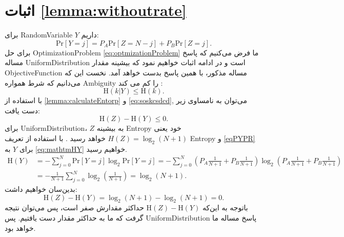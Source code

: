 \section{اثبات \autoref{lemma:withoutrate}}
\label{sec:withoutrate}
برای
\gls{RandomVariable} $Y$
داریم:
\begin{equation}
\mathrm{Pr}[Y=j] = P_A \mathrm{Pr}[Z=N-j]+P_B\mathrm{Pr}[Z=j].
\label{eqPYPR}
\end{equation}
برای حل
\gls{OptimizationProblem} \eqref{eq:optmizationProblem} 
ما فرض می‌کنیم که پاسخ مساله 
\gls{UniformDistribution}
است و در ادامه اثبات خواهیم نمود که بیشینه مقدار
\gls{ObjectiveFunction}
مساله مذکور، با همین پاسخ بدست خواهد آمد. نخست این که می‌دانیم که شرط همواره 
\gls{Ambiguity}
را کم می کند
\cite[صفحه 248]{marinescu2011classical}:
\begin{equation}
\mathrm{H}(k|Y) \leq \mathrm{H}(k).
\label{eq:soskcsdcd}
\end{equation}
با استفاده از 
 \autoref{lemma:calculateEntorp} و \eqref{eq:soskcsdcd}, 
 می‌توان به نامساوی زیر دست یافت:
\begin{equation}
\mathrm{H}(Z) - \mathrm{H}(Y) \leq 0.
\label{eq:maxvalreach}
\end{equation}
برای
\gls{UniformDistribution}، $Z$
به بیشینه
\gls{Entropy}
خود یعنی
$H(Z) = \log_2 (N+1)$
خواهد رسید
\cite[قضیه $1.4.2$]{ash2012information}.
با استفاده از تعریف
\gls{Entropy} و 
\eqref{eqPYPR}  برای  $Y$ 
به 
 \eqref{eq:mathtmHY}
خواهیم رسید. 
\begin{align}
\mathrm{H}(Y)  &= -\sum_{j=0}^{N}\mathrm{Pr}[Y=j] \log_2 \mathrm{Pr}[Y=j]= -\sum_{j=0}^{N} \left(P_A \frac{1}{N+1}+P_B\frac{1}{N+1}\right)\log_2 \left(P_A \frac{1}{N+1}+P_B\frac{1}{N+1}\right)\nonumber\\
&=-\frac{1}{N+1}\sum_{j=0}^{N}\log_2 \left(\frac{1}{N+1}\right)=\log_2 (N+1).
\label{eq:mathtmHY}
\end{align}
بدین‌سان خواهیم داشت:
\begin{equation*}
\mathrm{H}(Z) - \mathrm{H}(Y) = \log_2 (N+1) - \log_2 (N+1) =0.
\end{equation*}
باتوجه به این‌که 
$\mathrm{H}(Z) - \mathrm{H}(Y)$
حداکثر مقدارش صفر است، پس می‌توان نتیجه گرفت که ما به حداکثر مقدار دست یافتیم. پس 
\gls{UniformDistribution}
پاسخ مساله ما خواهد بود. 



